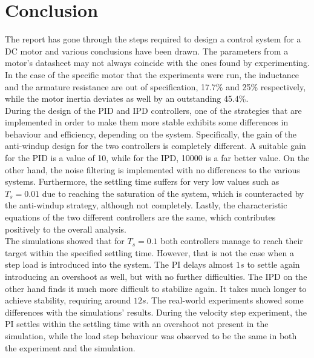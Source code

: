 \section{Conclusion}

The report has gone through the steps required to design a control system for a DC motor and various conclusions have been drawn. The parameters from a motor's datasheet may not always coincide with the ones found by experimenting. In the case of the specific motor that the experiments were run, the inductance and the armature resistance are out of specification, 17.7\% and 25\% respectively, while the motor inertia deviates as well by an outstanding 45.4\%. 
\\

During the design of the PID and IPD controllers, one of the strategies that are implemented in order to make them more stable exhibits some differences in behaviour and efficiency, depending on the system. Specifically, the gain of the anti-windup design for the two controllers is completely different. A suitable gain for the PID is a value of 10, while for the IPD, 10000 is a far better value. On the other hand, the noise filtering is implemented with no differences to the various systems. Furthermore, the settling time suffers for very low values such as $T_s=0.01$ due to reaching the saturation of the system, which is counteracted by the anti-windup strategy, although not completely. Lastly, the characteristic equations of the two different controllers are the same, which contributes positively to the overall analysis.
\\

The simulations showed that for $T_s=0.1$ both controllers manage to reach their target within the specified settling time. However, that is not the case when a step load is introduced into the system. The PI delays almost $1s$ to settle again introducing an overshoot as well, but with no further difficulties. The IPD on the other hand finds it much more difficult to stabilize again. It takes much longer to achieve stability, requiring around $12s$. The real-world experiments showed some differences with the simulations' results. During the velocity step experiment, the PI settles within the settling time with an overshoot not present in the simulation, while the load step behaviour was observed to be the same in both the experiment and the simulation.

